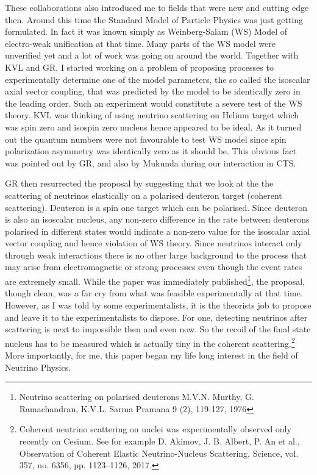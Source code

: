 These collaborations also introduced me to fields that were new and cutting edge then. Around this time the Standard Model of Particle Physics was just getting formulated. In fact it was known simply as Weinberg-Salam (WS) Model of electro-weak unification at that time. Many parts of the WS model were unverified yet and a lot of work was going on around the world. Together with KVL and GR, I started working on a problem of proposing processes to experimentally determine one of the model parameters, the so called the isoscalar axial vector coupling, that was predicted by the model to be identically zero in the leading order. Such an experiment would constitute a severe test of the WS theory. KVL was thinking of using neutrino scattering on Helium target which was spin zero and isospin zero nucleus hence appeared to be ideal. As it turned out the quantum numbers were not favourable to test WS model since spin polarization asymmetry was identically zero as it should be. This obvious fact was pointed out by GR, and also by Mukunda during our interaction in CTS.

GR then resurrected the proposal by suggesting that we look at the the scattering of neutrinos elastically on a polarised deuteron target (coherent scattering). Deuteron is a spin one target which can be polarised. Since deuteron is also an isoscalar nucleus, any non-zero difference in the rate between deuterons polarised in different states would indicate a non-zero value for the isoscalar axial vector coupling and hence violation of WS theory. Since neutrinos interact only through weak interactions there is no other large background to the process that may arise from electromagnetic or strong processes even though the event rates are extremely small. While the paper was immediately published\footnote{Neutrino scattering on polarised deuterons M.V.N. Murthy, G. Ramachandran, K.V.L. Sarma Pramana 9 (2), 119-127, 1976}, the proposal, though clean, was a far cry from what was feasible experimentally at that time. However, as I was told by some experimentalists, it is the theorists job to propose and leave it to the experimentalists to dispose. For one, detecting neutrinos after scattering is next to impossible then and even now. So the recoil of the final state nucleus has to be measured which is actually tiny in the coherent scattering.\footnote{Coherent neutrino scattering on nuclei was experimentally observed only recently on Cesium. See for example D. Akimov, J. B. Albert, P. An et al., Observation of Coherent Elastic Neutrino-Nucleus Scattering, Science, vol. 357, no. 6356, pp. 1123–1126, 2017.} More importantly, for me, this paper began my life long interest in the field of Neutrino Physics.


